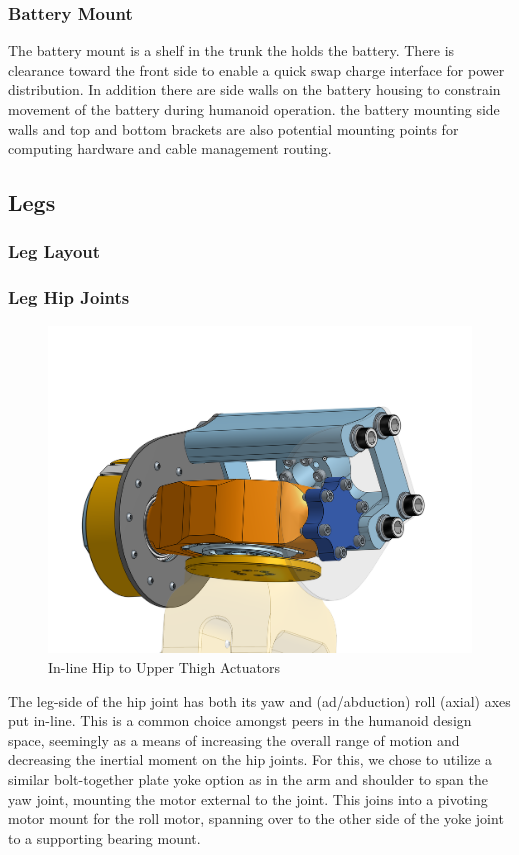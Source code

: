 \documentclass{article}
\begin{document}
\subsubsection{Battery Mount}
The battery mount is a shelf in the trunk the holds the battery. There is clearance toward the front side to enable a quick swap charge interface for power distribution. In addition there are side walls on the battery housing to constrain movement of the battery during humanoid operation. the battery mounting side walls and top and bottom brackets are also potential mounting points for computing hardware and cable management routing. 

\subsection{Legs}

\subsubsection{Leg Layout}

\subsubsection{Leg Hip Joints}

\begin{figure}
    \centering
    \includegraphics[width=0.5\linewidth]{assets/MOHRA/Sub-Leg/LegAssem_HipJoint.png}
    \caption{In-line Hip to Upper Thigh Actuators}
    \label{fig:enter-label}
\end{figure}

The leg-side of the hip joint has both its yaw and (ad/abduction) roll (axial) axes put in-line. This is a common choice amongst peers in the humanoid design space, %
seemingly as a means of increasing the overall range of motion and decreasing the inertial moment on the hip joints. For this, we chose to utilize a similar bolt-together plate yoke option as in the arm and shoulder to span the yaw joint, mounting the motor external to the joint. This joins into a pivoting motor mount for the roll motor, spanning over to the other side of the yoke joint to a supporting bearing mount.
\end{document}
